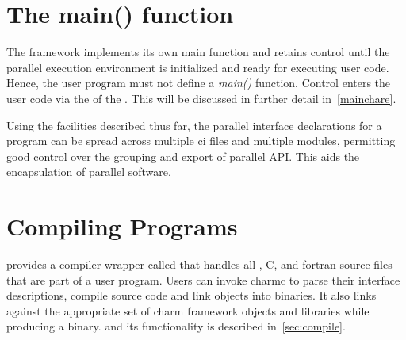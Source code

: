 \section{The main() function}

The \charmpp framework implements its own main\(\) function and retains control
until the parallel execution environment is initialized and ready for executing
user code. Hence, the user program must not define a \emph{main()} function.
Control enters the user code via the  of the .
This will be discussed in further detail in~\ref{mainchare}.

Using the facilities described thus far, the parallel interface declarations
for a \charm program can be spread across multiple ci files and multiple
modules, permitting good control over the grouping and export of parallel API.
This aids the encapsulation of parallel software.

\section{Compiling \charm Programs}

\charm provides a compiler-wrapper called  that handles all \ci, C,
\CC and fortran source files that are part of a user program. Users can invoke
charmc to parse their interface descriptions, compile source code and link
objects into binaries. It also links against the appropriate set of charm
framework objects and libraries while producing a binary.  and its functionality
is described in~\ref{sec:compile}.

